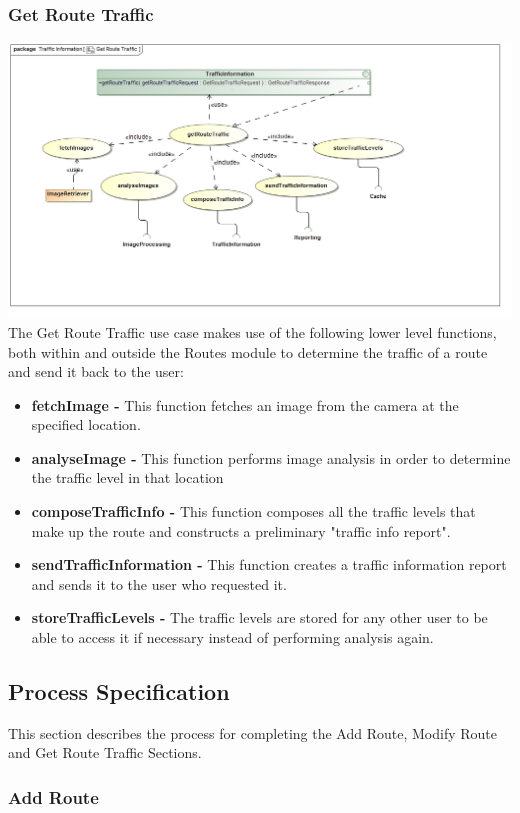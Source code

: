\documentclass[a4paper,12pt]{article}
\begin{document}
\subsubsection{Get Route Traffic}
\includegraphics[width=\textwidth]{images/Get_Route_Traffic.jpg}
The Get Route Traffic use case makes use of the following lower level functions, both within and outside the Routes module to determine the traffic of a route and send it back to the user:
\begin{itemize}
\item \textbf{fetchImage -} This function fetches an image from the camera at the specified location.
\item \textbf{analyseImage -} This function performs image analysis in order to determine the traffic level in that location
\item \textbf{composeTrafficInfo -} This function composes all the traffic levels that make up the route and constructs a preliminary "traffic info report".
\item \textbf{sendTrafficInformation -} This function creates a traffic information report and sends it to the user who requested it.
\item \textbf{storeTrafficLevels -} The traffic levels are stored for any other user to be able to access it if necessary instead of performing analysis again.
\end{itemize}

\subsection{Process Specification}
This section describes the process for completing the Add Route, Modify Route and Get Route Traffic Sections.
\subsubsection{Add Route}
\end{document}
